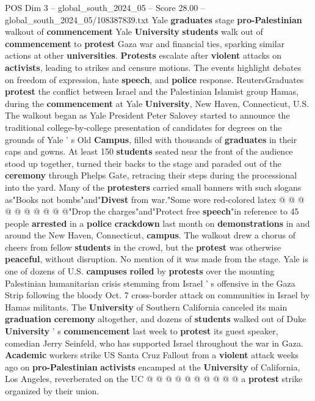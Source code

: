 \begin{textsample}{POS Dim 3 – global\_south\_2024\_05 – Score 28.00 – global\_south\_2024\_05/108387839.txt}  \label{ex:f3_pos_096}
Yale \textbf{graduates} stage \textbf{pro-Palestinian} walkout of \textbf{commencement} Yale \textbf{University} \textbf{students} walk out of \textbf{commencement} to \textbf{protest} Gaza war and financial ties, sparking similar actions at other \textbf{universities}. \textbf{Protests} escalate after \textbf{violent} attacks on \textbf{activists}, leading to strikes and censure motions.
The events highlight debates on freedom of expression, hate \textbf{speech}, and \textbf{police} response.
ReutersGraduates \textbf{protest} the conflict between Israel and the Palestinian Islamist group Hamas, during the \textbf{commencement} at Yale \textbf{University}, New Haven, Connecticut, U.S.
The walkout began as Yale President Peter Salovey started to announce the traditional college-by-college presentation of candidates for degrees on the grounds of Yale ' s Old \textbf{Campus}, filled with thousands of \textbf{graduates} in their caps and gowns.
At least 150 \textbf{students} seated near the front of the audience stood up together, turned their backs to the stage and paraded out of the \textbf{ceremony} through Phelps Gate, retracing their steps during the processional into the yard.
Many of the \textbf{protesters} carried small banners with such slogans as"Books not bombs"and"\textbf{Divest} from war."Some wore red-colored latex @ @ @ @ @ @ @ @ @ @"Drop the charges"and"Protect free \textbf{speech}"in reference to 45 people \textbf{arrested} in a \textbf{police} \textbf{crackdown} last month on \textbf{demonstrations} in and around the New Haven, Connecticut, \textbf{campus}.
The walkout drew a chorus of cheers from fellow \textbf{students} in the crowd, but the \textbf{protest} was otherwise \textbf{peaceful}, without disruption.
No mention of it was made from the stage.
Yale is one of dozens of U.S. \textbf{campuses} \textbf{roiled} by \textbf{protests} over the mounting Palestinian humanitarian crisis stemming from Israel ' s offensive in the Gaza Strip following the bloody Oct. 7 cross-border attack on communities in Israel by Hamas militants.
The \textbf{University} of Southern California canceled its main \textbf{graduation} \textbf{ceremony} altogether, and dozens of \textbf{students} walked out of Duke \textbf{University} ' s \textbf{commencement} last week to \textbf{protest} its guest speaker, comedian Jerry Seinfeld, who has supported Israel throughout the war in Gaza. \textbf{Academic} workers strike US Santa Cruz Fallout from a \textbf{violent} attack weeks ago on \textbf{pro-Palestinian} \textbf{activists} encamped at the \textbf{University} of California, Los Angeles, reverberated on the UC @ @ @ @ @ @ @ @ @ @ a \textbf{protest} strike organized by their union.

\end{textsample}
